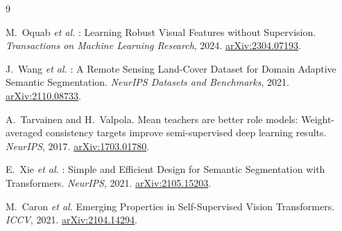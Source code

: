 \documentclass[11pt,a4paper]{article}
\begin{document}

\begin{thebibliography}{9}

  M.~Oquab \textit{et al.}
  : Learning Robust Visual Features without Supervision.
  \newblock \textit{Transactions on Machine Learning Research}, 2024.
  \newblock \href{https://arxiv.org/abs/2304.07193}{arXiv:2304.07193}.

  J.~Wang \textit{et al.}
  : A Remote Sensing Land-Cover Dataset for Domain Adaptive Semantic Segmentation.
  \newblock \textit{NeurIPS Datasets and Benchmarks}, 2021.
  \newblock \href{https://arxiv.org/abs/2110.08733}{arXiv:2110.08733}.

  A.~Tarvainen and H.~Valpola.
  \newblock Mean teachers are better role models: Weight-averaged consistency targets improve semi-supervised deep learning results.
  \newblock \textit{NeurIPS}, 2017.
  \newblock \href{https://arxiv.org/abs/1703.01780}{arXiv:1703.01780}.

  E.~Xie \textit{et al.}
  : Simple and Efficient Design for Semantic Segmentation with Transformers.
  \newblock \textit{NeurIPS}, 2021.
  \newblock \href{https://arxiv.org/abs/2105.15203}{arXiv:2105.15203}.

  M.~Caron \textit{et al.}
  \newblock Emerging Properties in Self-Supervised Vision Transformers.
  \newblock \textit{ICCV}, 2021.
  \newblock \href{https://arxiv.org/abs/2104.14294}{arXiv:2104.14294}.

\end{thebibliography}
\end{document}
